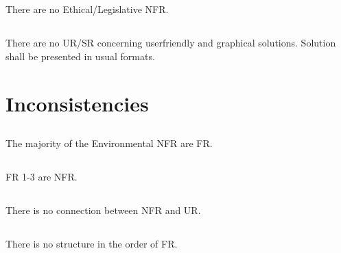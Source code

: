 \documentclass{article}
\begin{document}
\subsection{}
There are no Ethical/Legislative NFR.
\subsection{}
There are no UR/SR concerning userfriendly and graphical solutions. Solution shall be presented in usual formats.
\subsection{}

\section{Inconsistencies}

\subsection{}
The majority of the Environmental NFR are FR.
\subsection{}
FR 1-3 are NFR.
\subsection{}
There is no connection between NFR and UR.
\subsection{}
There is no structure in the order of FR.

 
\end{document}
